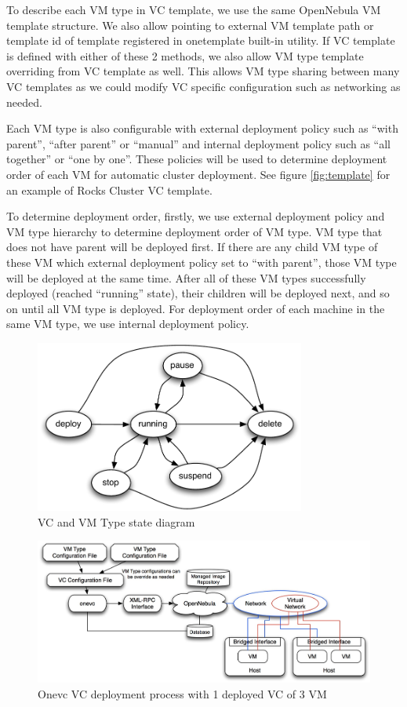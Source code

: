 \documentclass[conference]{IEEEtran}
\begin{document}
To describe each VM type in VC template, we use the same OpenNebula VM template structure.
We also allow pointing to external VM template path or template id of template registered in onetemplate built-in utility.
If VC template is defined with either of these 2 methods, we also allow VM type template overriding from VC template as well.
This allows VM type sharing between many VC templates as we could modify VC specific configuration such as networking as needed.

Each VM type is also configurable with external deployment policy such as ``with parent'', ``after parent'' or ``manual'' and internal deployment policy such as ``all together'' or ``one by one''.
These policies will be used to determine deployment order of each VM for automatic cluster deployment.
See figure \ref{fig:template} for an example of Rocks Cluster VC template.

To determine deployment order, firstly, we use external deployment policy and VM type hierarchy to determine deployment order of VM type.
VM type that does not have parent will be deployed first.
If there are any child VM type of these VM which external deployment policy set to ``with parent'', those VM type will be deployed at the same time.
After all of these VM types successfully deployed (reached ``running'' state), their children will be deployed next, and so on until all VM type is deployed.
For deployment order of each machine in the same VM type, we use internal deployment policy.

\begin{figure}[!t]
\centering
\includegraphics[width=3.5in]{state}
\caption{VC and VM Type state diagram}
\label{fig:state}
\end{figure}

\begin{figure}[!t]
\centering
\includegraphics[width=6.5in]{onevc}
\caption{Onevc VC deployment process with 1 deployed VC of 3 VM}
\label{fig:onevc}
\end{figure}
\end{document}
